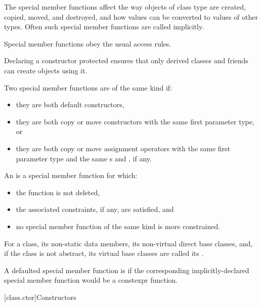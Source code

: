 \pnum
\begin{note}
The special member functions affect the way objects of class type are created,
copied, moved, and destroyed, and how values can be converted to values of other types.
Often such special member functions are called implicitly.
\end{note}

\pnum
{}%
Special member functions obey the usual access rules.
\begin{example}
Declaring a constructor protected
ensures that only derived classes and friends can create objects using it.
\end{example}

\pnum
Two special member functions are of the same kind if:
\begin{itemize}
\item they are both default constructors,
\item they are both copy or move constructors
with the same first parameter type, or
\item they are both copy or move assignment operators
with the same first parameter type
and the same s and , if any.
\end{itemize}

\pnum
An  is a special member function for which:
\begin{itemize}
\item the function is not deleted,
\item the associated constraints, if any, are satisfied, and
\item no special member function of the same kind is more constrained.
\end{itemize}

\pnum
For a class, its non-static data members, its non-virtual direct base classes,
and, if the class is not abstract, its virtual base
classes are called its .

\pnum
A defaulted special member function is
%
if the corresponding implicitly-declared special member function
would be a constexpr function.

[class.ctor]{Constructors}%

